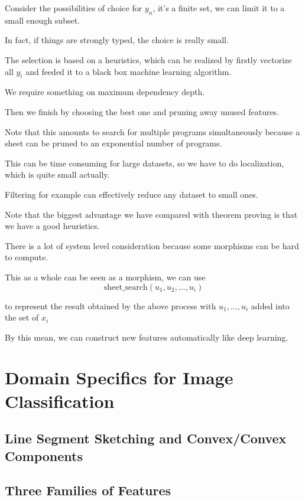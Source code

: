 \documentclass[11pt]{article} 	%
\theoremstyle{definition}
\begin{document}
Consider the possibilities of choice for $y_n$, it's a finite set, we can limit it to a small enough subset.

In fact, if things are strongly typed, the choice is really small.

The selection is based on a heuristics, which can be realized by firstly vectorize all $y_i$ and feeded it to a black box machine learning algorithm.

We require something on maximum dependency depth.

Then we finish by choosing the best one and pruning away unused features.

Note that this amounts to search for multiple programs simultaneously because a sheet can be pruned to an exponential number of programs.

This can be time consuming for large datasets, so we have to do localization, which is quite small actually.

Filtering for example can effectively reduce any dataset to small ones.

Note that the biggest advantage we have compared with theorem proving is that we have a good heuristics.

There is a lot of system level consideration because some morphisms can be hard to compute.

This as a whole can be seen as a morphism, we can use
\begin{equation}
	\text{sheet\_search}(u_1,u_2,..., u_i)
\end{equation}

to represent the result obtained by the above process with $u_1,...,u_i$ added into the set of $x_i$

By this mean, we can construct new features automatically like deep learning.

\section{Domain Specifics for Image Classification}

\subsection{Line Segment Sketching and Convex/Convex Components}

\subsection{Three Families of Features}
\end{document}

